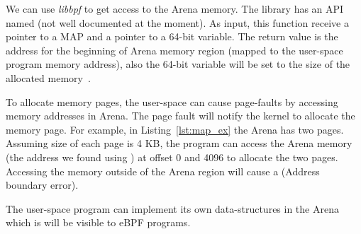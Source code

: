 \documentclass{article}
\begin{document}
We can use \emph{libbpf} to get access to the Arena memory.
The library has an API named  (not well documented
at the moment). As input, this function receive a pointer to a MAP and a pointer
to a 64-bit variable. The return value is the address for the beginning of Arena
memory region (mapped to the user-space program memory address), also the
64-bit variable will be set to the size of the allocated
memory~\cite{libbpf_initial_value}.

To allocate memory pages, the user-space can cause page-faults by accessing
memory addresses in Arena. The page fault will notify the kernel to allocate
the memory page. For example, in Listing~\ref{lst:map_ex} the Arena has two
pages. Assuming size of each page is 4 KB, the program can access the Arena
memory (the address we found using ) at offset 0
and 4096 to allocate the two pages. Accessing the memory outside of the Arena
region will cause a  (Address boundary error).

The user-space program can implement its own data-structures in the Arena which
is will be visible to eBPF programs.



\end{document}
